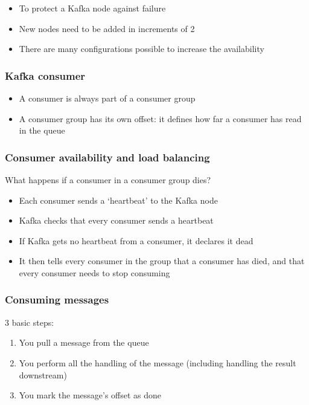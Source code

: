 \documentclass{article}
\begin{document}
\begin{itemize}
    \item To protect a Kafka node against failure
    \item New nodes need to be added in increments of 2
    \item There are many configurations possible to increase the availability
\end{itemize}

\subsubsection{Kafka consumer}

\begin{itemize}
    \item A consumer is always part of a consumer group
    \item A consumer group has its own offset: it defines how far a consumer has read in the queue
\end{itemize}

\subsubsection{Consumer availability and load balancing}

What happens if a consumer in a consumer group dies?

\begin{itemize}
    \item Each consumer sends a `heartbeat' to the Kafka node
    \item Kafka checks that every consumer sends a heartbeat
    \item If Kafka gets no heartbeat from a consumer, it declares it dead
    \item It then tells every consumer in the group that a consumer has died, and that every consumer needs to stop consuming
\end{itemize}

\subsubsection{Consuming messages}

3 basic steps:

\begin{enumerate}
    \item You pull a message from the queue
    \item You perform all the handling of the message (including handling the result downstream)
    \item You mark the message's offset as done 
\end{enumerate}
\end{document}
